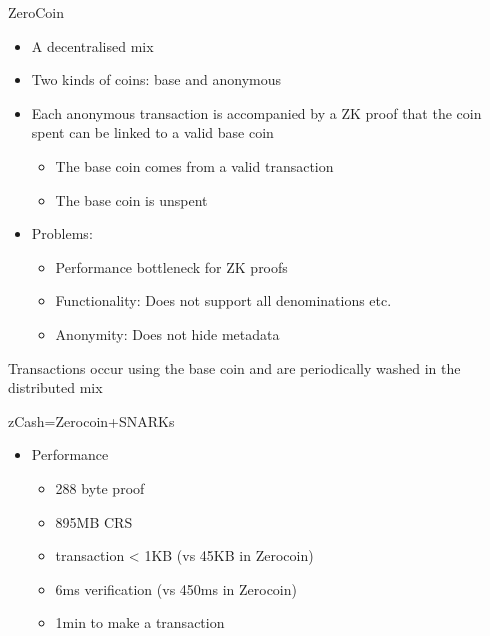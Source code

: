 \documentclass[handout]{beamer}
\begin{document}
\begin{frame}{ZeroCoin}
    \begin{itemize} 
    \item A decentralised mix
    \item Two kinds of coins: base and anonymous
    \item Each anonymous transaction is accompanied by a ZK proof that the coin spent can be linked to a valid base coin
    \begin{itemize} 
        \item The base coin comes from a valid transaction
        \item The base coin is unspent
    \end{itemize}
    \item Problems:
        \begin{itemize}
            \item Performance bottleneck for ZK proofs
            \item Functionality: Does not support all denominations etc.
            \item Anonymity: Does not hide metadata
        \end{itemize}
    \end{itemize}
    \item Transactions occur using the base coin and are periodically washed in the distributed mix
\end{frame}

\begin{frame}{zCash=Zerocoin+SNARKs}
    \begin{itemize}
        \item Performance
        \begin{itemize}
            \begin{itemize}
                 \item 288 byte proof
                 \item 895MB CRS
                 \item transaction < 1KB (vs 45KB in Zerocoin)
                 \item 6ms verification (vs 450ms in Zerocoin)
                 \item 1min to make a transaction
            \end{itemize}
        \end{itemize}
    \end{itemize}
\end{frame}
\end{document}
